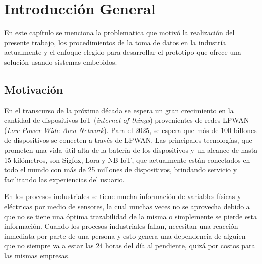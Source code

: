 
\chapter{Introducción General} %
En este capítulo se menciona la problematica que motivó la realización del presente trabajo, los procedimientos de la toma de datos en la industría actualmente y el enfoque elegido para desarrollar el prototipo que ofrece una solución usando sistemas embebidos.
\label{Chapter1} %
\label{IntroGeneral}


\newcommand{\keyword}[1]{\textbf{#1}}
\newcommand{\tabhead}[1]{\textbf{#1}}
\newcommand{\code}[1]{\texttt{#1}}
\newcommand{\file}[1]{\texttt{\bfseries#1}}
\newcommand{\option}[1]{\texttt{\itshape#1}}
\newcommand{\grados}{$^{\circ}$}



\section{Motivación}
En el transcurso de la próxima década se espera un gran crecimiento en la cantidad de dispositivos IoT (\textit{internet of things}) provenientes de redes LPWAN (\textit{Low-Power Wide Area Network}). Para el 2025, se espera que más de 100 billones de dispositivos se conecten a través de LPWAN\cite{taylor2015world}. Las principales tecnologías, que prometen una vida útil alta de la batería de los dispositivos y un alcance de hasta 15 kilómetros, son Sigfox, Lora y NB-IoT, que actualmente están conectados en todo el mundo con más de 25 millones de dispositivos, brindando servicio y facilitando las experiencias del usuario\cite{iotanalytics}.

En los procesos industriales se tiene mucha información de variables físicas y eléctricas por medio de sensores, la cual muchas veces no se aprovecha debido a que no se tiene una óptima trazabilidad de la misma o simplemente se pierde esta información. Cuando los procesos industriales fallan, necesitan una reacción inmediata por parte de una persona y esto genera una dependencia de alguien que no siempre va a estar las 24 horas del día al pendiente, quizá por costos para las mismas empresas.

